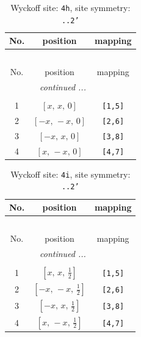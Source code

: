 \documentclass[fleqn,8pt]{jsarticle}
\begin{document}
\begin{longtable}{ccc}
\caption{Wyckoff site: {\tt 4h}, site symmetry: {\tt ..2'}}
 \\
 \hline \hline
No. & position & mapping \\ \hline \endfirsthead

\multicolumn{2}{l}{\tablename\ \thetable{}} \\
 \hline \hline
No. & position & mapping \\ \hline \endhead

 \hline \hline
\multicolumn{2}{r}{\footnotesize\it continued ...} \\ \endfoot

 \hline \hline
\multicolumn{2}{r}{} \\ \endlastfoot

1 & $\left[ x,\, x,\, 0 \right]$ & {\tt [1,5]} \\ \hline
2 & $\left[ - x,\, - x,\, 0 \right]$ & {\tt [2,6]} \\ \hline
3 & $\left[ - x,\, x,\, 0 \right]$ & {\tt [3,8]} \\ \hline
4 & $\left[ x,\, - x,\, 0 \right]$ & {\tt [4,7]} \\
\end{longtable}
\renewcommand{\arraystretch}{1.2}
\begin{longtable}{ccc}
\caption{Wyckoff site: {\tt 4i}, site symmetry: {\tt ..2'}}
 \\
 \hline \hline
No. & position & mapping \\ \hline \endfirsthead

\multicolumn{2}{l}{\tablename\ \thetable{}} \\
 \hline \hline
No. & position & mapping \\ \hline \endhead

 \hline \hline
\multicolumn{2}{r}{\footnotesize\it continued ...} \\ \endfoot

 \hline \hline
\multicolumn{2}{r}{} \\ \endlastfoot

1 & $\left[ x,\, x,\, \frac{1}{2} \right]$ & {\tt [1,5]} \\ \hline
2 & $\left[ - x,\, - x,\, \frac{1}{2} \right]$ & {\tt [2,6]} \\ \hline
3 & $\left[ - x,\, x,\, \frac{1}{2} \right]$ & {\tt [3,8]} \\ \hline
4 & $\left[ x,\, - x,\, \frac{1}{2} \right]$ & {\tt [4,7]} \\
\end{longtable}
\end{document}
